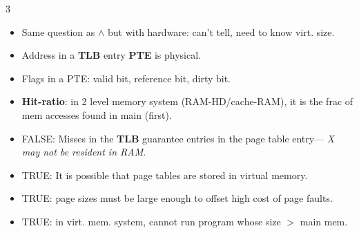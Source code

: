 \documentclass[fontsize=4.5pt]{scrartcl}
\begin{document}
\begin{multicols}{3}
\begin{itemize}
        \item Same question as $\wedge$ but with hardware: can't tell, need to know virt. size.
        \item Address in a \textbf{TLB} entry \textbf{PTE} is physical.
        \item Flags in a PTE: valid bit, reference bit, dirty bit.
        \item \textbf{Hit-ratio}: in 2 level memory system (RAM-HD/cache-RAM), it is the frac of mem accesses found in main (first).
        \item FALSE: Misses in the \textbf{TLB} guarantee entries in the page table entry--- \textit{X may not be resident in RAM}.
        \item TRUE: It is possible that page tables are stored in virtual memory.
        \item TRUE: page sizes must be large enough to offset high cost of page faults.
        \item TRUE: in virt. mem. system, cannot run program whose size $>$ main mem.

\end{itemize}
\end{multicols}
\end{document}
